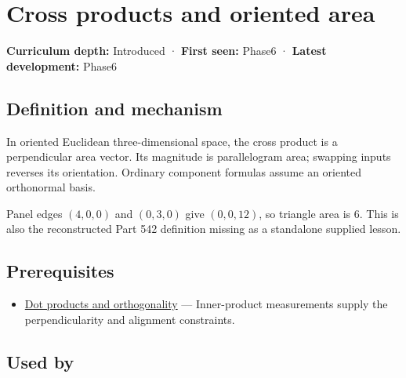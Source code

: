 \hypertarget{appendix-2391db8052b1}{}\label{referencestart:appendix-2391db8052b1}
\section{Cross products and oriented area}\label{appendix-2391db8052b1-cross-products-and-oriented-area}

\textbf{Curriculum depth:} Introduced · \textbf{First seen:} Phase6 · \textbf{Latest development:} Phase6

\subsection{Definition and mechanism}\label{appendix-2391db8052b1-definition-and-mechanism}

In oriented Euclidean three-dimensional space, the cross product is a perpendicular area vector. Its magnitude is parallelogram area; swapping inputs reverses its orientation. Ordinary component formulas assume an oriented orthonormal basis.

Panel edges \((4,0,0)\) and \((0,3,0)\) give \((0,0,12)\), so triangle area is \(6\). This is also the reconstructed Part 542 definition missing as a standalone supplied lesson.

\subsection{Prerequisites}\label{appendix-2391db8052b1-prerequisites}

\begin{itemize}
\tightlist
\item
  \hyperref[appendix-8bc4e8fc547c]{Dot products and orthogonality} --- Inner-product measurements supply the perpendicularity and alignment constraints.
\end{itemize}

\subsection{Used by}\label{appendix-2391db8052b1-used-by}

